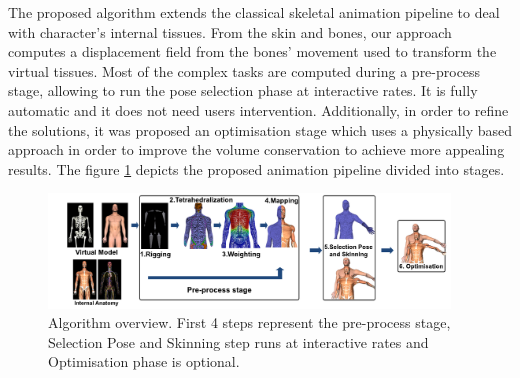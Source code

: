 
The proposed algorithm extends the classical skeletal animation pipeline to deal with character's internal tissues. From the skin and bones, our approach computes a displacement field from the bones’ movement used to transform the virtual tissues. Most of the complex tasks are computed during a pre-process stage, allowing to run the pose selection phase at interactive rates. It is fully automatic and it does not need users intervention.  Additionally, in order to refine the solutions, it was proposed an optimisation stage which uses a physically based approach in order to improve the volume conservation to achieve more appealing results. The figure \ref{fig:summaryarq} depicts the proposed animation pipeline divided into stages. 


\renewcommand{\figurename}{Figure}
\begin{figure}[ht]
    \centering
    \includegraphics[width=0.95\textwidth]{IMG/summaryarq.pdf}
    \caption{Algorithm overview. First 4 steps represent the pre-process stage, Selection Pose and Skinning step runs at interactive rates and Optimisation phase is optional.}
    \label{fig:summaryarq}
\end{figure}
\renewcommand{\figurename}{Figura}

